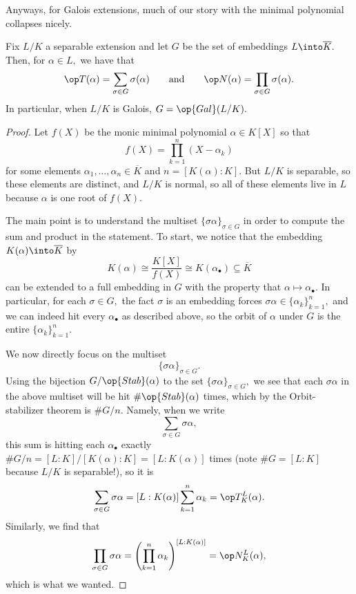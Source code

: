 Anyways, for Galois extensions, much of our story with the minimal polynomial collapses nicely.
\begin{proposition} \label{lem:galoisnormtrace}
	Fix $L/K$ a separable extension and let $G$ be the set of embeddings $L\into\overline K.$ Then, for $\alpha\in L,$ we have that
	\[\op T(\alpha)=\sum_{\sigma\in G}\sigma(\alpha)\qquad\text{and}\qquad\op N(\alpha)=\prod_{\sigma\in G}\sigma(\alpha).\]
	In particular, when $L/K$ is Galois, $G=\op{Gal}(L/K).$
\end{proposition}
\begin{proof}
	Let $f(X)$ be the monic minimal polynomial $\alpha\in K[X]$ so that
	\[f(X)=\prod_{k=1}^n(X-\alpha_k)\]
	for some elements $\alpha_1,\ldots,\alpha_n\in\overline K$ and $n=[K(\alpha):K].$ But $L/K$ is separable, so these elements are distinct, and $L/K$ is normal, so all of these elements live in $L$ because $\alpha$ is one root of $f(X).$

	The main point is to understand the multiset $\{\sigma\alpha\}_{\sigma\in G}$ in order to compute the sum and product in the statement. To start, we notice that the embedding $K(\alpha)\into\overline K$ by
	\[K(\alpha)\cong\frac{K[X]}{f(X)}\cong K(\alpha_\bullet)\subseteq\overline K\]
	can be extended to a full embedding in $G$ with the property that $\alpha\mapsto\alpha_\bullet.$ In particular, for each $\sigma\in G,$ the fact $\sigma$ is an embedding forces $\sigma\alpha\in\{\alpha_k\}_{k=1}^n,$ and we can indeed hit every $\alpha_\bullet$ as described above, so the orbit of $\alpha$ under $G$ is the entire $\{\alpha_k\}_{k=1}^n.$

	We now directly focus on the multiset
	\[\{\sigma\alpha\}_{\sigma\in G}.\]
	Using the bijection $G/\op{Stab}(\alpha)$ to the set $\{\sigma\alpha\}_{\sigma\in G},$ we see that each $\sigma\alpha$ in the above multiset will be hit $\#\op{Stab}(\alpha)$ times, which by the Orbit-stabilizer theorem is $\#G/n.$ Namely, when we write
	\[\sum_{\sigma\in G}\sigma\alpha,\]
	this sum is hitting each $\alpha_\bullet$ exactly $\#G/n=[L:K]/[K(\alpha):K]=[L:K(\alpha)]$ times (note $\#G=[L:K]$ because $L/K$ is separable!), so it is
	\[\sum_{\sigma\in G}\sigma\alpha=[L:K(\alpha)]\sum_{k=1}^n\alpha_k=\op T^L_K(\alpha).\]
	Similarly, we find that
	\[\prod_{\sigma\in G}\sigma\alpha=\left(\prod_{k=1}^n\alpha_k\right)^{[L:K(\alpha)]}=\op N^L_K(\alpha),\]
	which is what we wanted.
\end{proof}

